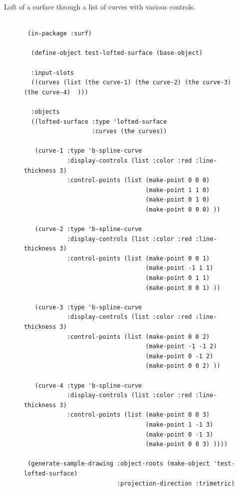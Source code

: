 \documentclass [11pt]{book}
\begin{document}
\begin{itemize}
\begin{description}
Loft of a surface through a list of curves with
various controls. 



\end{description}




\begin{figure}
\begin{lrbox}{\boxedverb}
\begin{minipage}{\linewidth}
{\small

\begin{verbatim}
                  
 (in-package :surf)

  (define-object test-lofted-surface (base-object)
  
  :input-slots
  ((curves (list (the curve-1) (the curve-2) (the curve-3) (the curve-4)  )))
  
  :objects
  ((lofted-surface :type 'lofted-surface
                   :curves (the curves))
   
   (curve-1 :type 'b-spline-curve
            :display-controls (list :color :red :line-thickness 3)
            :control-points (list (make-point 0 0 0)
                                  (make-point 1 1 0)
                                  (make-point 0 1 0)
                                  (make-point 0 0 0) ))
   
   (curve-2 :type 'b-spline-curve
            :display-controls (list :color :red :line-thickness 3)
            :control-points (list (make-point 0 0 1)
                                  (make-point -1 1 1)
                                  (make-point 0 1 1)
                                  (make-point 0 0 1) ))
           
   (curve-3 :type 'b-spline-curve
            :display-controls (list :color :red :line-thickness 3)
            :control-points (list (make-point 0 0 2)
                                  (make-point -1 -1 2)
                                  (make-point 0 -1 2)
                                  (make-point 0 0 2) ))
   
   (curve-4 :type 'b-spline-curve
            :display-controls (list :color :red :line-thickness 3)
            :control-points (list (make-point 0 0 3)
                                  (make-point 1 -1 3)
                                  (make-point 0 -1 3)
                                  (make-point 0 0 3) ))))

 (generate-sample-drawing :object-roots (make-object 'test-lofted-surface)
                          :projection-direction :trimetric)


\end{verbatim}}
\end{minipage}
\end{lrbox}
\end{figure}
\end{itemize}
\end{document}
